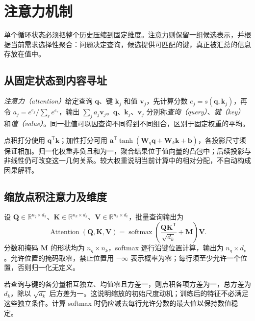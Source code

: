 \setcounter{chapter}{12} %
\chapter{注意力机制}
\label{chap:dl-attention}
单个循环状态必须把整个历史压缩到固定维度。注意力则保留一组候选表示，并根据当前需求选择性聚合：问题决定查询，候选提供可匹配的键，真正被汇总的信息存放在值中。

\section{从固定状态到内容寻址}
\emph{注意力（attention）}给定查询 $\mathbf q$、键 $\mathbf k_j$ 和值 $\mathbf v_j$，先计算分数 $e_j=s(\mathbf q,\mathbf k_j)$，再令 $a_j=e^{e_j}/\sum_re^{e_r}$，输出 $\sum_ja_j\mathbf v_j$。$\mathbf q$、$\mathbf k_j$、$\mathbf v_j$ 分别称\emph{查询（query）}、\emph{键（key）}和\emph{值（value）}。同一批值可以因查询不同得到不同组合，区别于固定权重的平均。

点积打分使用 $\mathbf q^\mathsf T\mathbf k$；加性打分可用 $\mathbf a^\mathsf T\tanh(\mathbf W_q\mathbf q+\mathbf W_k\mathbf k+\mathbf b)$，各投影尺寸须保证相加。归一化权重非负且和为一，聚合结果位于值向量的凸包中；后续投影与非线性仍可改变这一几何关系。较大权重说明当前计算中的相对分配，不自动构成因果解释。

\section{缩放点积注意力及维度}
设 $\mathbf Q\in\mathbb R^{n_q\times d_k}$、$\mathbf K\in\mathbb R^{n_k\times d_k}$、$\mathbf V\in\mathbb R^{n_k\times d_v}$，批量查询输出为
\begin{equation}
\operatorname{Attention}(\mathbf Q,\mathbf K,\mathbf V)
=\operatorname{softmax}\!\left(\frac{\mathbf Q\mathbf K^\mathsf T}{\sqrt{d_k}}+\mathbf M\right)\mathbf V.
\label{eq:dl-attention}
\end{equation}
分数和掩码 $\mathbf M$ 的形状均为 $n_q\times n_k$，softmax 逐行沿键位置计算，输出为 $n_q\times d_v$。允许位置的掩码取零，禁止位置用 $-\infty$ 表示概率为零；每行须至少允许一个位置，否则归一化无定义。

若查询与键的各分量相互独立、均值零且方差一，则点积各项方差为一，总方差为 $d_k$，除以 $\sqrt{d_k}$ 后方差为一。这说明缩放的初始尺度动机；训练后的特征不必满足这些独立条件。计算 softmax 时仍应减去每行允许分数的最大值以保持数值稳定。

